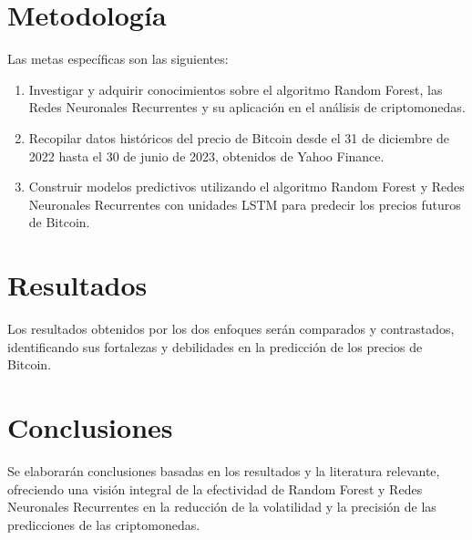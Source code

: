 \documentclass[final, 20pt, a2paper, portrait]{extarticle}
\begin{document}
\section*{Metodología}
Las metas específicas son las siguientes:
    \begin{enumerate}
        \item Investigar y adquirir conocimientos sobre el algoritmo Random Forest, las Redes Neuronales Recurrentes y su aplicación en el análisis de criptomonedas.
        \item Recopilar datos históricos del precio de Bitcoin desde el 31 de diciembre de 2022 hasta el 30 de junio de 2023, obtenidos de Yahoo Finance.
        \item Construir modelos predictivos utilizando el algoritmo Random Forest y Redes Neuronales Recurrentes con unidades LSTM para predecir los precios futuros de Bitcoin.
    \end{enumerate}

\section*{Resultados}
Los resultados obtenidos por los dos enfoques serán comparados y contrastados, identificando sus fortalezas y debilidades en la predicción de los precios de Bitcoin.
\section*{}
\vspace{2cm}
\section*{Conclusiones}
Se elaborarán conclusiones basadas en los resultados y la literatura relevante, ofreciendo una visión integral de la efectividad de Random Forest y Redes Neuronales Recurrentes en la reducción de la volatilidad y la precisión de las predicciones de las criptomonedas.
\end{document}

